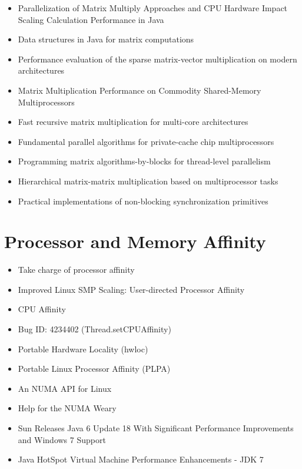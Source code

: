 \begin{itemize}
  \cite{Ramachandran2008}
\item[\textbullet] Parallelization of Matrix Multiply Approaches and
  CPU Hardware Impact Scaling Calculation Performance in Java
  \cite{Kim2010}
\item[\textbullet] Data structures in Java for matrix computations
  \cite{Gundersen2004}
\item[\textbullet] Performance evaluation of the sparse matrix-vector
  multiplication on modern architectures \cite{Goumas2009}
\item[\textbullet] Matrix Multiplication Performance on Commodity
  Shared-Memory Multiprocessors \cite{Tsilikas2004}
\item[\textbullet] Fast recursive matrix multiplication for multi-core
  architectures \cite{Runger2010}
\item[\textbullet] Fundamental parallel algorithms for private-cache
  chip multiprocessors \cite{Arge2008}
\item[\textbullet] Programming matrix algorithms-by-blocks for
  thread-level parallelism \cite{Quintana-Orti2009}
\item[\textbullet] Hierarchical matrix-matrix multiplication based on
  multiprocessor tasks \cite{Hunold2004}
\item[\checkmark] Practical implementations of non-blocking
  synchronization primitives \cite{Moir1997}
\end{itemize}


\section*{Processor and Memory Affinity}
\label{sec:lr-processor-and-memory-affinity}

\begin{itemize}
\item[\checkmark] Take charge of processor affinity \cite{Dow2005}
\item[\checkmark] Improved Linux SMP Scaling: User-directed Processor Affinity
  \cite{Foong2008}
\item[\checkmark] CPU Affinity \cite{Love2003}
\item[\checkmark] Bug ID: 4234402 (Thread.setCPUAffinity)
  \cite{Oracle1999}
\item[\checkmark] Portable Hardware Locality (hwloc)
  \cite{OpenMPI2010}
\item[\checkmark] Portable Linux Processor Affinity (PLPA)
  \cite{OpenMPI2010a}
\item[\checkmark] An NUMA API for Linux \cite{Kleen2004}
\item[\checkmark] Help for the NUMA Weary \cite{Masamitsu2008}
\item[\checkmark] Sun Releases Java 6 Update 18 With Significant
  Performance Improvements and Windows 7 Support \cite{Humble2010}
\item[\checkmark] Java HotSpot Virtual Machine Performance
  Enhancements - JDK 7 \cite{Oracle2010}
\end{itemize}


